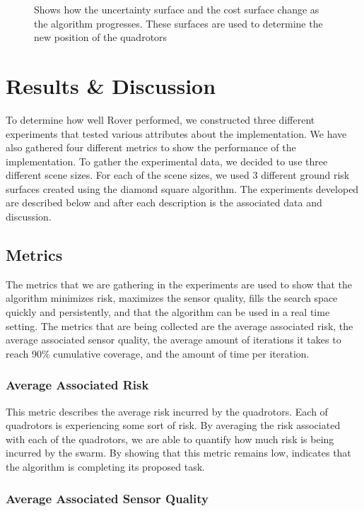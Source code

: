 \documentclass{article}
\begin{document}
\begin{figure}[ht]
    \caption{Shows how the uncertainty surface and the cost surface change
        as the algorithm progresses. These surfaces are used to determine
        the new position of the quadrotors}

    \label{fig:together}

\end{figure}

\section{Results \& Discussion}

To determine how well Rover performed, we constructed three different
experiments that tested various attributes about the implementation. We have
also gathered four different metrics to show the performance of the
implementation. To gather the experimental data, we decided to use three
different scene sizes. For each of the scene sizes, we used 3 different ground
risk surfaces created using the diamond square algorithm. The experiments
developed are described below and after each description is the associated data
and discussion.

\subsection{Metrics}

The metrics that we are gathering in the experiments are used to show that the
algorithm minimizes risk, maximizes the sensor quality, fills the search space
quickly and persistently, and that the algorithm can be used in a real time
setting. The metrics that are being collected are the average associated risk,
the average associated sensor quality, the average amount of iterations it
takes to reach 90\% cumulative coverage, and the amount of time per iteration.

\subsubsection{Average Associated Risk}

This metric describes the average risk incurred by the quadrotors. Each of
quadrotors is experiencing some sort of risk. By averaging the risk associated
with each of the quadrotors, we are able to quantify how much risk is being
incurred by the swarm. By showing that this metric remains low, indicates that
the algorithm is completing its proposed task.

\subsubsection{Average Associated Sensor Quality}
\end{document}
